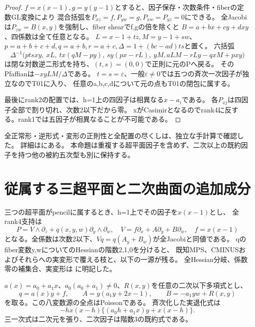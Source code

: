 \documentclass[a4paper,11pt]{ltjsarticle}
\theoremstyle{definition}
\begin{document}
\begin{proof}
$f=x(x-1),g=y(y-1)$とすると、因子保存・次数条件・fiberの定数GL変換により
混合括弧を$P_{xz}=f,P_{yw}=g,P_{xw}=P_{yz}=0$にできる。
全Jacobiは$P_{zw}=B(x,y)$を強制し、fiber shearでf,gの倍を除くと
$B=a+bx+cy+dxy$、四係数は全て任意となる。
$L=x-1+tz,M=y-1+sw$、$p=a+b+c+d,q=a+b,r=a+c,\Delta=1+(bc-ad)ts$と置く。
六括弧
\[
 \Delta^{-1}\bigl(ptsxy,\ xL,\ tx(qM-py),\ sy(px-rL),\ yM,
                 aLM-rLy-qxM+pxy\bigr)
\]
は閉な対数逆二形式を持ち、$(t,s)=(0,0)$で正則に元のPへ戻る。
そのPfaffianは$-xyLM/\Delta$である。
$t=s=\varepsilon$、一般$\varepsilon\ne0$では五つの斉次一次因子が独立なのでT01に入り、
任意のa,b,c,dについて元の点もT01の閉包に属する。

最後にrank2の配置では、h=1上の四因子は相異なる$x-a_i$である。
各$P_{xj}$は四因子全部で割り切れ、次数2以下だから零。
xがCasimirとなるのでrank4に反する。rank1では五因子が相異なることが不可能である。
\end{proof}

全正常形・逆形式・変形の正則性と全配置の尽くしは、独立な手計算で確認した。
詳細はにある。
本命題は重複する超平面因子を含めず、二次以上の既約因子を持つ他の被約五次型も別に保持する。

\section{従属する三超平面と二次曲面の追加成分}
三つの超平面がpencilに属するとき、h=1上でその因子を$x(x-1)$とし、
全rank4支持は
\[
 P=V\wedge\partial_z+q(x,y,w)\partial_y\wedge\partial_w,\quad
 V=f\partial_x+A\partial_y+B\partial_w,\quad f=x(x-1)
\]
となる。全係数は次数2以下、$Vq=q(A_y+B_w)$が全Jacobiと同値である。
qのfiber変数y,wについてのHessianの階数2,1,0を分けると、
既知MPS、CMINUSおよびそれらへの実変形で覆える枝と、以下の一源が残る。
全Hessian分岐、係数零の補集合、実変形は
に明記した。

$a(x)=a_0+a_1x$、$a_0(a_0+a_1)\ne0$、$R(x,y)$を任意の二次以下多項式とし、
\[
 q=a(x)y+f,\qquad A=y(a_1y+2x-1),\qquad B=-a_1yw+R(x,y)
\]
を取る。この八変数源の全点はPoissonである。
斉次化した実退化式は
\[
 -hx(x-h)\{(a_0h+a_1x)y+x(x-h)\}.
\]
三一次式は二次元を張り、二次因子は階数3の既約式である。
\end{document}
